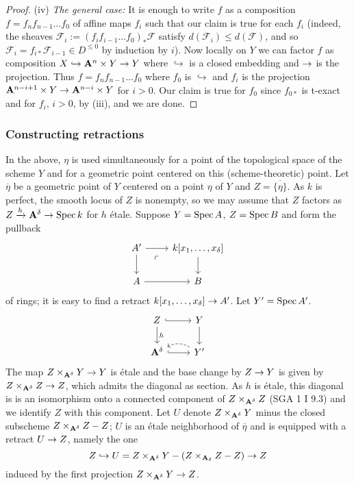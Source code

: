 \documentclass[deligne.tex]{subfiles}
\begin{document}
\begin{proof}
(iv) \emph{The general case:} It is enough to write $f$ as a composition
$f=f_nf_{n-1}\ldots f_0$ of affine maps $f_i$ such that our claim is true
for each $f_i$ (indeed, the sheaves
$\mathcal F_i:=(f_if_{i-1}\ldots f_0)_*\mathcal F$
satisfy $d(\mathcal F_i)\leq d(\mathcal F)$, and so
$\mathcal F_i=f_{i*}\mathcal F_{i-1}\in D^{\leq0}$ by induction by $i$).
Now locally on $Y$ we can factor $f$ as composition
$X\hookrightarrow\mathbf{A}^n\times Y\rightarrow Y$ where $\hookrightarrow$ is a closed
embedding and $\rightarrow$ is the projection. Thus
$f=f_nf_{n-1}\ldots f_0$ where $f_0$ is $\hookrightarrow$ and $f_i$ is the 
projection $\mathbf{A}^{n-i+1}\times Y\rightarrow\mathbf{A}^{n-i}\times Y$ for $i>0$. Our claim is
true for $f_0$ since $f_{0*}$ is t-exact and for $f_i$, $i>0$, by (iii),
and we are done.
\end{proof}

\subsubsection*{Constructing retractions}
In the above, $\eta$ is used simultaneously for a point of the topological
space of the scheme $Y$ and for a geometric point centered on this
(scheme-theoretic) point.
Let $\overline\eta$ be a geometric point of $Y$ centered on a point
$\eta$ of $Y$ and $Z=\overline{\{\eta\}}$.
As $k$ is perfect, the smooth locus of $Z$ is nonempty, so we may
assume that $Z$ factors as $Z\xrightarrow h\mathbf{A}^\delta\rightarrow\operatorname{Spec} k$ for $h$ étale.
Suppose $Y=\operatorname{Spec} A$, $Z=\operatorname{Spec} B$ and form the pullback
\begin{equation*}\begin{tikzcd}
	A'\arrow[d]\arrow[r]\arrow[dr,"\ulcorner",phantom,near start]&k[x_1,\ldots,x_\delta]\arrow[d] \\
	A\arrow[r]&B
\end{tikzcd}\end{equation*}
of rings; it is easy to find a retract $k[x_1,\ldots,x_\delta]\rightarrow A'$.
Let $Y'=\operatorname{Spec} A'$.
\begin{equation*}\begin{tikzcd}
	Z\arrow[r,hook]\arrow[d,"h"]&Y\arrow[d] \\
	\A^\delta\arrow[r,hook]&Y'\arrow[l,bend right,dashed]
\end{tikzcd}\end{equation*}
The map $Z\times_{\mathbf{A}^\delta}Y\rightarrow Y$ is étale and the base change by
$Z\rightarrow Y$ is given by $Z\times_{\mathbf{A}^\delta}Z\rightarrow Z$, which admits the diagonal
as section. As $h$ is étale, this diagonal is is an isomorphism onto a
connected component of $Z\times_{\mathbf{A}^\delta}Z$ (SGA 1 I 9.3) and we identify
$Z$ with this component. Let $U$ denote
$Z\times_{\mathbf{A}^\delta}Y$ minus the closed subscheme $Z\times_{\mathbf{A}^\delta}Z-Z$;
$U$ is an étale neighborhood of $\overline\eta$ and is equipped with a 
retract $U\rightarrow Z$, namely the one
\begin{equation*}
	Z\hookrightarrow U=Z\times_{\mathbf{A}^\delta}Y-(Z\times_{\mathbf{A}_\delta}Z-Z)
	\rightarrow Z
\end{equation*}
induced by the first projection $Z\times_{\mathbf{A}^\delta}Y\rightarrow Z$.
\end{document}
